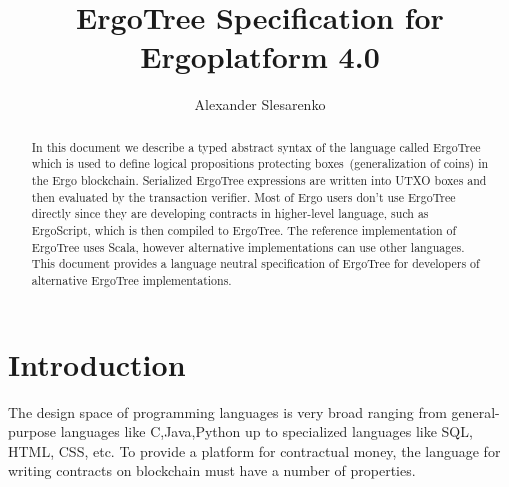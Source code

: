\documentclass[11pt]{article}
\newcommand{\ASDag}{ErgoTree\xspace}
\begin{document}
\title{\ASDag Specification for Ergoplatform 4.0}

\author{Alexander Slesarenko}

\maketitle

\begin{abstract}
In this document we describe a typed abstract syntax of the language called \ASDag
which is used to define logical propositions protecting boxes~(generalization of
coins) in the Ergo blockchain. Serialized \ASDag expressions are written into UTXO
boxes and then evaluated by the transaction verifier. Most of Ergo users don't use
\ASDag directly since they are developing contracts in higher-level language, such as
ErgoScript, which is then compiled to \ASDag. The reference implementation of \ASDag
uses Scala, however alternative implementations can use other languages. This document
provides a language neutral specification of \ASDag for developers of alternative
\ASDag implementations.

\end{abstract}

\tableofcontents

\section{Introduction}
\label{sec:intro}

The design space of programming languages is very broad ranging from general-purpose
languages like C,Java,Python up to specialized languages like SQL, HTML, CSS, etc. To
provide a platform for contractual money, the language for writing contracts on
blockchain must have a number of properties.
\end{document}
